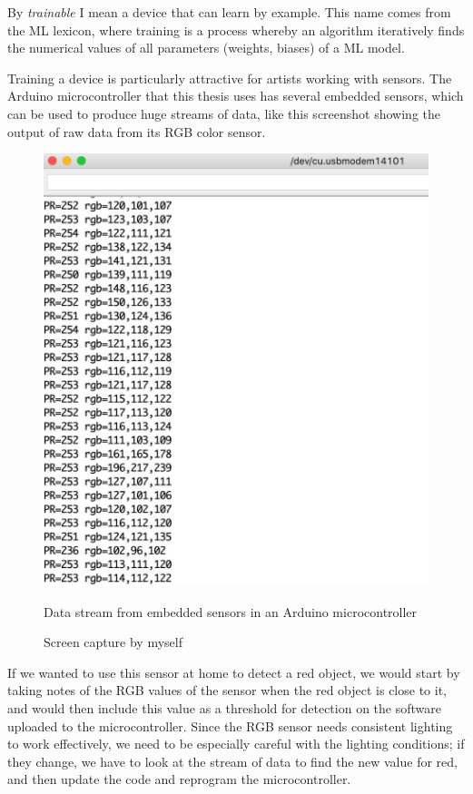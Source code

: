 By \emph{trainable} I mean a device that can learn by example. This name comes from the \acrshort{ML} lexicon, where training is a process whereby an algorithm  iteratively finds the numerical values of all parameters (weights, biases) of a \acrshort{ML} model.

Training a device is particularly attractive for artists working with sensors. The Arduino microcontroller that this thesis uses has several embedded sensors, which can be used to produce huge streams of data, like this screenshot showing the output of raw data from its \acrshort{RGB} color sensor.

\begin{figure}[ht]
  \centering
  \includegraphics[width=0.75\linewidth,height=0.40\textheight,keepaspectratio]{images/arduino-data-stream.jpg}
  \caption{Data stream from embedded sensors in an Arduino microcontroller}
  \caption*{Screen capture by myself}
  \label{fig:arduino-data-stream}
\end{figure}

If we wanted to use this sensor at home to detect a red object, we would start by taking notes of the \acrshort{RGB} values of the sensor when the red object is close to it, and would then include this value as a threshold for detection on the software uploaded to the microcontroller. Since the \acrshort{RGB} sensor needs consistent lighting to work effectively, we need to be especially careful with the lighting conditions; if they change, we have to look at the stream of data to find the new value for red, and then update the code and reprogram the microcontroller.

